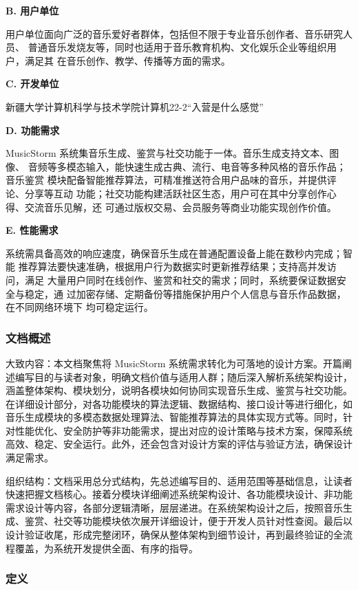 \documentclass{base}
\numberwithin{figure}{section} %
\begin{document}
\textbf{B. 用户单位​}

用户单位面向广泛的音乐爱好者群体，包括但不限于专业音乐创作者、音乐研究人员、	普通音乐发烧友等，同时也适用于音乐教育机构、文化娱乐企业等组织用户，满足其	在音乐创作、教学、传播等方面的需求。​

\textbf{C. 开发单位​}

新疆大学计算机科学与技术学院计算机22-2“入营是什么感觉”

\textbf{D. 功能需求​}

MusicStorm 系统集音乐生成、鉴赏与社交功能于一体。音乐生成支持文本、图像、	音频等多模态输入，能快速生成古典、流行、电音等多种风格的音乐作品；音乐鉴赏	模块配备智能推荐算法，可精准推送符合用户品味的音乐，并提供评论、分享等互动	功能；社交功能构建活跃社区生态，用户可在其中分享创作心得、交流音乐见解，还	可通过版权交易、会员服务等商业功能实现创作价值。

\textbf{E. 性能需求​}

系统需具备高效的响应速度，确保音乐生成在普通配置设备上能在数秒内完成；智能	推荐算法要快速准确，根据用户行为数据实时更新推荐结果；支持高并发访问，满足	大量用户同时在线创作、鉴赏和社交的需求；同时，系统要保证数据安全与稳定，通	过加密存储、定期备份等措施保护用户个人信息与音乐作品数据，在不同网络环境下	均可稳定运行。

\subsubsection{文档概述}

大致内容：本文档聚焦将 MusicStorm 系统需求转化为可落地的设计方案。开篇阐述编写目的与读者对象，明确文档价值与适用人群；随后深入解析系统架构设计，涵盖整体架构、模块划分，说明各模块如何协同实现音乐生成、鉴赏与社交功能。在详细设计部分，对各功能模块的算法逻辑、数据结构、接口设计等进行细化，如音乐生成模块的多模态数据处理算法、智能推荐算法的具体实现方式等。同时，针对性能优化、安全防护等非功能需求，提出对应的设计策略与技术方案，保障系统高效、稳定、安全运行。此外，还会包含对设计方案的评估与验证方法，确保设计满足需求。​

组织结构：文档采用总分式结构，先总述编写目的、适用范围等基础信息，让读者快速把握文档核心。接着分模块详细阐述系统架构设计、各功能模块设计、非功能需求设计等内容，各部分逻辑清晰，层层递进。在系统架构设计之后，按照音乐生成、鉴赏、社交等功能模块依次展开详细设计，便于开发人员针对性查阅。最后以设计验证收尾，形成完整闭环，确保从整体架构到细节设计，再到最终验证的全流程覆盖，为系统开发提供全面、有序的指导。

\subsubsection{定义}
\end{document}
